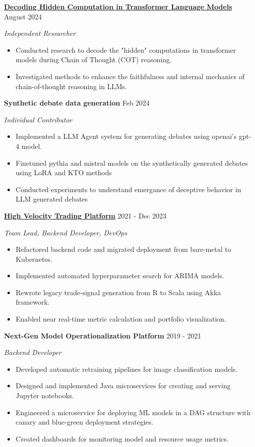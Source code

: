 \documentclass[fontsize=11pt]{article}
\newcommand{\sepspace}{\vspace*{1em}}
\newcommand{\ProjectEntry}[4]{
    \noindent \textbf{#1} \hfill {#2} \par
    \noindent \textit{#3} \par
    \noindent \small #4
    \normalsize \par}
\begin{document}
\sepspace

\ProjectEntry{\href{https://github.com/rokosbasilisk/filler_tokens}{Decoding Hidden Computation in Transformer Language Models}}{August 2024}{Independent Researcher}
{%
\begin{itemize}
\item Conducted research to decode the "hidden" computations in transformer models during Chain of Thought (COT) reasoning.
\item Investigated methods to enhance the faithfulness and internal mechanics of chain-of-thought reasoning in LLMs.
\end{itemize}}

\sepspace

\ProjectEntry{Synthetic debate data generation}{Feb 2024}{Individual Contributor}
{%
\begin{itemize}
\item Implemented a LLM Agent system for generating debates using openai's gpt-4 model.
\item Finetuned pythia and mistral models on the synthetically generated debates using LoRA and KTO methods
\item Conducted experiments to understand emergance of deceptive behavior in LLM generated debates 
\end{itemize}}

\sepspace
\sepspace
\ProjectEntry{\href{https://tplusone.org}{High Velocity Trading Platform}}{2021 - Dec 2023}{Team Lead, Backend Developer, DevOps}
{%
\begin{itemize}
\item Refactored backend code and migrated deployment from bare-metal to Kubernetes.
\item Implemented automated hyperparameter search for ARIMA models.
\item Rewrote legacy trade-signal generation from R to Scala using Akka framework.
\item Enabled near real-time metric calculation and portfolio visualization.
\end{itemize}}

\sepspace

\ProjectEntry{Next-Gen Model Operationalization Platform}{2019 - 2021}{Backend Developer}
{%
\begin{itemize}
\item Developed automatic retraining pipelines for image classification models.
\item Designed and implemented Java microservices for creating and serving Jupyter notebooks.
\item Engineered a microservice for deploying ML models in a DAG structure with canary and blue-green deployment strategies.
\item Created dashboards for monitoring model and resource usage metrics.
\end{itemize}}
\end{document}
